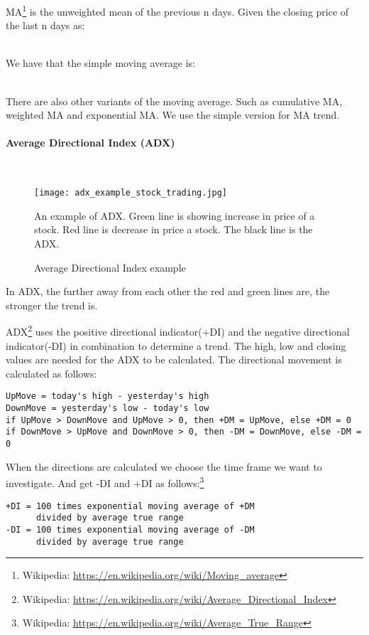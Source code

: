 MA\footnote{Wikipedia: \url{https://en.wikipedia.org/wiki/Moving_average}} is
the unweighted mean of the previous n days. Given the closing price of the last
n days as: 

\\

We have that the simple moving average is: 

\\

There are also other variants of the moving average. Such as cumulative MA,
weighted MA and exponential MA. We use the simple version for MA trend. 

\paragraph{Average Directional Index (ADX)}
\hspace{0pt}\\

\begin{figure}[htb]
    \centering
    \texttt{[image: adx\_example\_stock\_trading.jpg]}
    \label{fig:adx_example_stock_trading}
    \caption{Average Directional Index example}
An example of ADX. Green line is showing increase in price of a stock. Red line is
decrease in price a stock. The black line is the ADX.
\end{figure}
In ADX, the further away from each other the red and green lines are, the
stronger the trend is. 

ADX\footnote{Wikipedia:
\url{https://en.wikipedia.org/wiki/Average_Directional_Index}} uses the positive directional indicator(+DI) and the negative directional
indicator(-DI) in combination to determine a trend. The high, low and closing
values are needed for the ADX to be calculated. The directional movement is
calculated as follows: 
\begin{verbatim}
UpMove = today's high - yesterday's high
DownMove = yesterday's low - today's low
if UpMove > DownMove and UpMove > 0, then +DM = UpMove, else +DM = 0
if DownMove > UpMove and DownMove > 0, then -DM = DownMove, else -DM = 0 
\end{verbatim} 

When the directions are calculated we choose the time frame we want to
investigate. And get -DI and +DI as follows:\footnote{Wikipedia:
\url{https://en.wikipedia.org/wiki/Average_True_Range}}
\begin{verbatim}
+DI = 100 times exponential moving average of +DM 
      divided by average true range
-DI = 100 times exponential moving average of -DM 
      divided by average true range 
\end{verbatim} 

